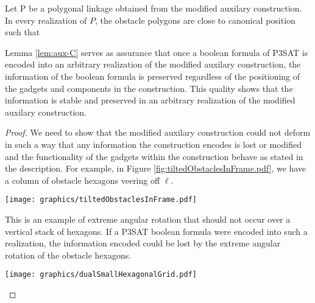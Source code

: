 \begin{lem}\label{lem:aux-C}
Let P be a polygonal linkage obtained from the modified auxilary construction.  
In every realization of $P$, the obstacle polygons are close to canonical position such that 
\end{lem}

Lemma \ref{lem:aux-C} serves as assurance that once a boolean formula of P3SAT is encoded into an arbitrary realization of the modified auxilary construction, the information of the boolean formula is preserved regardless of the positioning of the gadgets and components in the construction.
This quality shows that the information is stable and preserved in an arbitrary realization of the modified auxilary construction.

\begin{proof}
We need to show that the modified auxilary construction could not deform in such a way that any information the construction encodes is lost or modified and the functionality of the gadgets within the construction behave as stated in the description. 
For example, in Figure \ref{fig:tiltedObstaclesInFrame.pdf}, we have a column of obstacle hexagons veering off $\ell$.

\begin{minipage}{\linewidth}
\begin{center}
\texttt{[image: graphics/tiltedObstaclesInFrame.pdf]}
\label{fig:tiltedObstaclesInFrame.pdf}
\end{center}
\end{minipage}

This is an example of extreme angular rotation that should not occur over a vertical stack of hexagons. 
If a P3SAT boolean formula were encoded into such a realization, the information encoded could be lost by the extreme angular rotation of the obstacle hexagons.

\begin{minipage}{\linewidth}
\begin{center}
\texttt{[image: graphics/dualSmallHexagonalGrid.pdf]}
\label{fig:dualSmallHexagonalGrid.pdf}
\end{center}
\end{minipage}


\end{proof}
